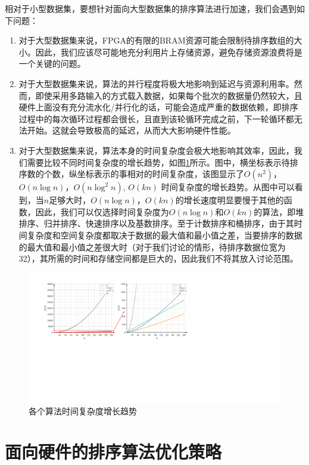 相对于小型数据集，要想针对面向大型数据集的排序算法进行加速，我们会遇到如下问题：
\begin{enumerate}
    \item 对于大型数据集来说，FPGA的有限的BRAM资源可能会限制待排序数组的大小。因此，我们应该尽可能地充分利用片上存储资源，避免存储资源浪费将是一个关键的问题。
    \item 对于大型数据集来说，算法的并行程度将极大地影响到延迟与资源利用率。然而，即使采用多路输入的方式载入数据，如果每个批次的数据量仍然较大，且硬件上面没有充分流水化/并行化的话，可能会造成严重的数据依赖，即排序过程中的每次循环过程都会很长，且直到该轮循环完成之前，下一轮循环都无法开始。这就会导致极高的延迟，从而大大影响硬件性能。
    \item 对于大型数据集来说，算法本身的时间复杂度会极大地影响其效率，因此，我们需要比较不同时间复杂度的增长趋势，如图\ref{fig:time complexity}所示。图中，横坐标表示待排序数的个数，纵坐标表示的事相对的时间复杂度，该图显示了$O(n^2)$，$O(n\log n)$，$O(n\log^2n)$, $O(kn)$ 时间复杂度的增长趋势。从图中可以看到，当$n$足够大时，$O(n\log n)$，$O(kn)$的增长速度明显要慢于其他的函数，因此，我们可以仅选择时间复杂度为$O(n\log n)$和$O(kn)$的算法，即堆排序、归并排序、快速排序以及基数排序。至于计数排序和桶排序，由于其时间复杂度和空间复杂度都取决于数据的最大值和最小值之差，当要排序的数据的最大值和最小值之差很大时（对于我们讨论的情形，待排序数据位宽为32），其所需的时间和存储空间都是巨大的，因此我们不将其放入讨论范围。
\end{enumerate}
\begin{figure}[htbp]
    \centering
    \includegraphics[width=\linewidth]{figures/time complexity.pdf}
    \caption{各个算法时间复杂度增长趋势}
    \label{fig:time complexity}
\end{figure}


\section{面向硬件的排序算法优化策略}

